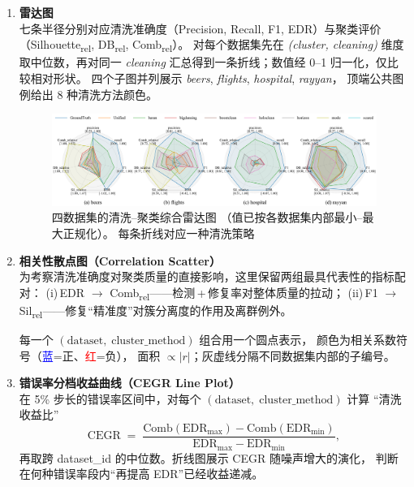 \documentclass[10pt]{article} %
\numberwithin{equation}{section}
\begin{document}
\begin{enumerate}[label=(\alph*)]
\item \textbf{雷达图}\\
七条半径分别对应清洗准确度（Precision, Recall, F1, EDR）与聚类评价
（Silhouette\textsubscript{rel}, DB\textsubscript{rel}, Comb\textsubscript{rel}）。
对每个数据集先在 \emph{(cluster, cleaning)} 维度取中位数，再对同一
\emph{cleaning} 汇总得到一条折线；数值经 0–1 归一化，仅比较相对形状。
四个子图并列展示 \textit{beers}, \textit{flights}, \textit{hospital}, \textit{rayyan}，
顶端公共图例给出 8 种清洗方法颜色。\vspace{3pt}

\begin{figure}[t]
  \centering
  \includegraphics[width=\linewidth]{figures/6.4.3graph/radar_four_in_one.pdf}
  \caption{四数据集的清洗–聚类综合雷达图  
           （值已按各数据集内部最小–最大正规化）。  
           每条折线对应一种清洗策略}
  \label{fig:radar_four_in_one}
\end{figure}

\item \textbf{相关性散点图（Correlation Scatter）}\\
为考察清洗准确度对聚类质量的直接影响，这里保留两组最具代表性的指标配对：  
(i) EDR $\rightarrow$ Comb\textsubscript{rel}\;——检测\,+\,修复率对整体质量的拉动；  
(ii) F1 $\rightarrow$ Sil\textsubscript{rel}\;——修复“精准度”对簇分离度的作用及离群例外。

每一个 $(\text{dataset},\;\text{cluster\_method})$ 组合用一个圆点表示，
颜色为相关系数符号（\textcolor{blue}{蓝}=正、\textcolor{red}{红}=负），
面积 $\propto |r|$；灰虚线分隔不同数据集内部的子编号。

\item \textbf{错误率分档收益曲线（CEGR Line Plot）}\\

在 5\% 步长的错误率区间中，对每个 $(\text{dataset},\;\text{cluster\_method})$
计算 “清洗收益比”  
\[
  \text{CEGR}\;=\;
  \dfrac{\mathrm{Comb}(\mathrm{EDR}_{\max})-\mathrm{Comb}(\mathrm{EDR}_{\min})}
        {\mathrm{EDR}_{\max}-\mathrm{EDR}_{\min}},
\]
再取跨 dataset\_id 的中位数。折线图展示 CEGR 随噪声增大的演化，
判断在何种错误率段内“再提高 EDR”已经收益递减。



\end{enumerate}
\end{document}
